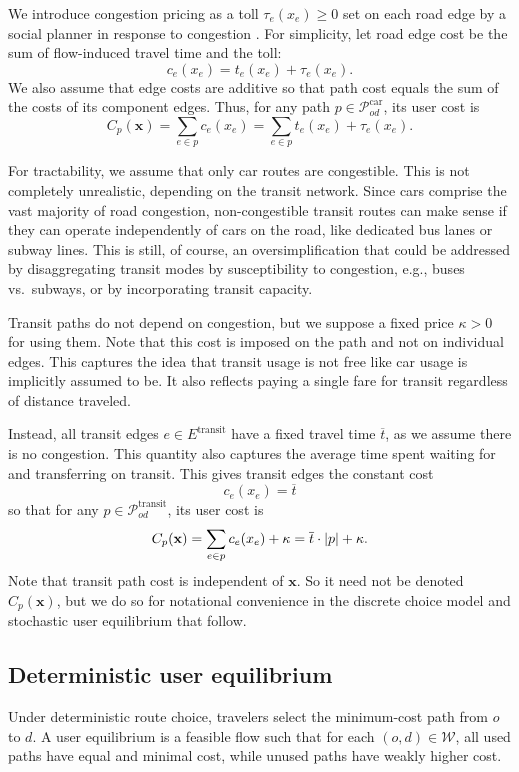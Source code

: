\documentclass[12pt]{article}
\newcommand{\Etransit}{E^\text{transit}}
\newcommand{\Pset}{\mathcal{P}}
\newcommand{\PcarOD}{\Pset_{od}^\text{car}}
\newcommand{\PtransitOD}{\Pset_{od}^\text{transit}}
\renewcommand{\vec}[1]{\mathbf{#1}}
\DeclarePairedDelimiter{\abs}{\lvert}{\rvert}
\begin{document}
We introduce congestion pricing as a toll $\tau_e(x_e) \geq 0$ set on each road edge by a social planner in response to congestion \citep{vickrey1969congestion}.
For simplicity, let road edge cost be the sum of flow-induced travel time and the toll:
\[
    c_e(x_e) = t_e(x_e) + \tau_e(x_e).
\]
We also assume that edge costs are additive so that path cost equals the sum of the costs of its component edges.
Thus, for any path $p \in \PcarOD$, its user cost is
\[
    C_p(\vec{x}) = \sum_{e \in p}{c_e(x_e)} = \sum_{e \in p}{t_e(x_e) + \tau_e(x_e)}.
\]

For tractability, we assume that only car routes are congestible.
This is not completely unrealistic, depending on the transit network. 
Since cars comprise the vast majority of road congestion, non-congestible transit routes can make sense if they can operate independently of cars on the road, like dedicated bus lanes or subway lines.
This is still, of course, an oversimplification that could be addressed by disaggregating transit modes by susceptibility to congestion, e.g., buses vs.\ subways, or by incorporating transit capacity.

Transit paths do not depend on congestion, but we suppose a fixed price $\kappa > 0$ for using them.
Note that this cost is imposed on the path and not on individual edges.
This captures the idea that transit usage is not free like car usage is implicitly assumed to be.
It also reflects paying a single fare for transit regardless of distance traveled.

Instead, all transit edges $e \in \Etransit$ have a fixed travel time $\overline{t}$, as we assume there is no congestion.
This quantity also captures the average time spent waiting for and transferring on transit.
This gives transit edges the constant cost
\[
    c_{e}(x_{e}) = \overline{t}
\]
so that for any $p \in \PtransitOD$, its user cost is 
\[
    C_p(\vec{x}) = \sum_{e \in p}{c_{e}(x_{e})} + \kappa = \overline{t} \cdot \abs{p} + \kappa.
\]
Note that transit path cost is independent of $\vec{x}$.
So it need not be denoted $C_p(\vec{x})$, but we do so for notational convenience in the discrete choice model and stochastic user equilibrium that follow.

\subsection{Deterministic user equilibrium}

Under deterministic route choice, travelers select the minimum-cost path from $o$ to $d$.
A user equilibrium \citep{wardrop1952traffic} is a feasible flow such that for each $(o, d) \in \mathcal{W}$, all used paths have equal and minimal cost, while unused paths have weakly higher cost.
\end{document}
